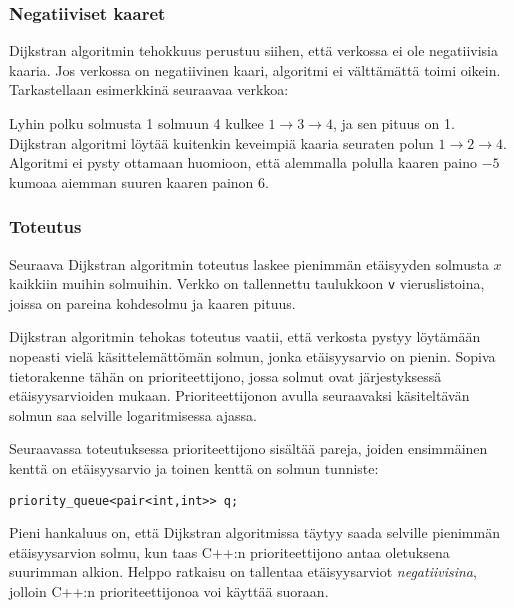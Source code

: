 \subsubsection{Negatiiviset kaaret}

Dijkstran algoritmin tehokkuus perustuu siihen,
että verkossa ei ole negatiivisia kaaria.
Jos verkossa on negatiivinen kaari,
algoritmi ei välttämättä toimi oikein.
Tarkastellaan esimerkkinä seuraavaa verkkoa:

\begin{center}
\end{center}
\noindent
Lyhin polku solmusta 1 solmuun 4 kulkee
$1 \rightarrow 3 \rightarrow 4$,
ja sen pituus on 1.
Dijkstran algoritmi löytää
kuitenkin keveimpiä kaaria seuraten
polun $1 \rightarrow 2 \rightarrow 4$.
Algoritmi ei pysty ottamaan huomioon,
että alemmalla polulla kaaren paino $-5$
kumoaa aiemman suuren kaaren painon $6$.

\subsubsection{Toteutus}

Seuraava Dijkstran algoritmin toteutus laskee
pienimmän etäisyyden solmusta $x$ kaikkiin muihin solmuihin.
Verkko on tallennettu taulukkoon \texttt{v}
vieruslistoina, joissa on pareina kohdesolmu
ja kaaren pituus.

Dijkstran algoritmin tehokas toteutus vaatii,
että verkosta pystyy löytämään
nopeasti vielä käsittelemättömän solmun,
jonka etäisyysarvio on pienin.
Sopiva tietorakenne tähän on prioriteettijono,
jossa solmut ovat järjestyksessä etäisyys\-arvioiden mukaan.
Prioriteettijonon avulla
seuraavaksi käsiteltävän solmun saa selville logaritmisessa ajassa.

Seuraavassa toteutuksessa prioriteettijono sisältää
pareja, joiden ensimmäinen kenttä on etäisyysarvio
ja toinen kenttä on solmun tunniste:
\begin{lstlisting}
priority_queue<pair<int,int>> q;
\end{lstlisting}
Pieni hankaluus on,
että Dijkstran algoritmissa täytyy saada selville
pienimmän etäisyysarvion solmu,
kun taas C++:n prioriteettijono antaa oletuksena
suurimman alkion.
Helppo ratkaisu on tallentaa etäisyysarviot
\textit{negatiivisina}, jolloin C++:n prioriteettijonoa
voi käyttää suoraan.

